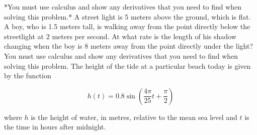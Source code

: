 \documentclass[12pt,addpoints]{exam}
\begin{document}
\begin{questions}
*You must use calculus and show any derivatives that you need to find when solving this problem.*
\fillwithlines{3cm}
\question[5] A street light is 5 meters above the ground, which is flat. A boy, who is 1.5 meters tall, is walking away from the point directly below the streetlight at 2 meters per second. At what rate is the length of his shadow changing when the boy is 8 meters away from the point directly under the light? You must use calculus and show any derivatives that you need to find when solving this problem.
\fillwithlines{3cm}
\question[5] The height of the tide at a particular beach today is given by the function

\[ h(t) = 0.8 \sin \left( \frac{4\pi}{25} t + \frac{\pi}{2} \right) \]

where \( h \) is the height of water, in metres, relative to the mean sea level and \( t \) is the time in hours after midnight.


\end{questions}
\end{document}
